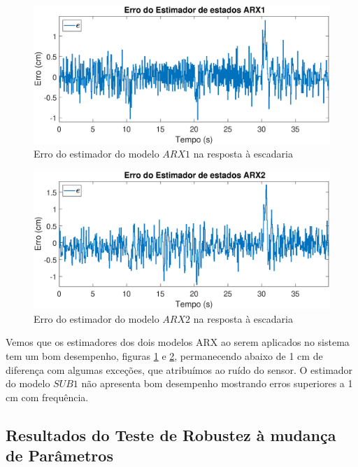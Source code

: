 \begin{figure}[htb]
	\centering
	\includegraphics[width=1\linewidth]{erroarx1}
	\caption[Erro do estimador do modelo $ARX1$ na resposta à escadaria]{Erro do estimador do modelo $ARX1$ na resposta à escadaria}
	\label{fig:erroarx1}
\end{figure}

\begin{figure}[htb]
	\centering
	\includegraphics[width=1\linewidth]{erroarx2}
	\caption[Erro do estimador do modelo $ARX2$ na resposta à escadaria]{Erro do estimador do modelo $ARX2$ na resposta à escadaria}
	\label{fig:erroarx2}
\end{figure}

Vemos que os estimadores dos dois modelos ARX ao serem aplicados no sistema tem um bom desempenho, figuras \ref{fig:erroarx1} e \ref{fig:erroarx2}, permanecendo abaixo de 1 cm de diferença com algumas exceções, que atribuímos ao ruído do sensor. O estimador do modelo $SUB1$ não apresenta bom desempenho mostrando erros superiores a 1 cm com frequência.


\subsection{Resultados do Teste de Robustez à mudança de Parâmetros}\label{rmp}

